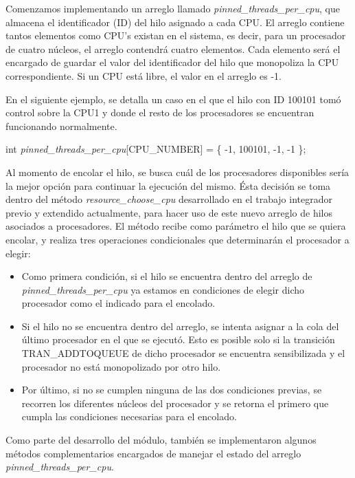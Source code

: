 Comenzamos implementando un arreglo llamado \textit{pinned\_threads\_per\_cpu}, que almacena el identificador (ID) del hilo asignado a cada CPU. El arreglo contiene tantos elementos como CPU's existan en el sistema, es decir, para un procesador de cuatro núcleos, el arreglo contendrá cuatro elementos. Cada elemento será el encargado de guardar el valor del identificador del hilo que monopoliza la CPU correspondiente.  Si un CPU está libre, el valor en el arreglo es -1.

En el siguiente ejemplo, se detalla un caso en el que el hilo con ID 100101 tomó control sobre la CPU1 y donde el resto de los procesadores se encuentran funcionando normalmente.

int \textit{pinned\_threads\_per\_cpu}[CPU\_NUMBER] = \{ -1, 100101, -1, -1 \};

Al momento de encolar el hilo, se busca cuál de los procesadores disponibles sería la mejor opción para continuar la ejecución del mismo. Ésta decisión se toma dentro del método \textit{resource\_choose\_cpu} desarrollado en el trabajo integrador previo y extendido actualmente, para hacer uso de este nuevo arreglo de hilos asociados a procesadores. El método recibe como parámetro el hilo que se quiera encolar, y realiza tres operaciones condicionales que determinarán el procesador a elegir:

\begin{itemize}
    \item Como primera condición, si el hilo se encuentra dentro del arreglo de \textit{pinned\_threads\_per\_cpu} ya estamos en condiciones de elegir dicho procesador como el indicado para el encolado.
    \item Si el hilo no se encuentra dentro del arreglo, se intenta asignar a la cola del último procesador en el que se ejecutó. Esto es posible solo si la transición TRAN\_ADDTOQUEUE de dicho procesador se encuentra sensibilizada y el procesador no está monopolizado por otro hilo.
    \item Por último, si no se cumplen ninguna de las dos condiciones previas, se recorren los diferentes núcleos del procesador y se retorna el primero que cumpla las condiciones necesarias para el encolado.
\end{itemize}

Como parte del desarrollo del módulo, también se implementaron algunos métodos complementarios encargados de manejar el estado del arreglo \textit{pinned\_threads\_per\_cpu}.


